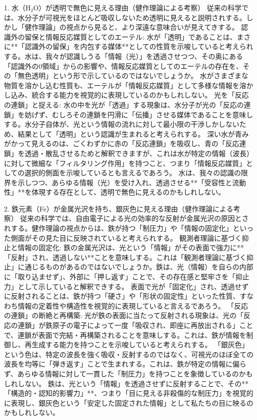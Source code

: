 \documentclass{article}
\begin{document}
1. 水（H₂O）が透明で無色に見える理由（健作理論による考察）
従来の科学では、水分子が可視光をほとんど吸収しないため透明に見えると説明されする。しかし「健作理論」の視点から見ると、より深遠な意味合いが見えてきする。
認識外の留保と情報反応媒質としてのエーテル: 
水が「透明」であることは、まさに**「認識外の留保」を内包する媒体**としての性質を示唆していると考えられする。水は、我々が認識しうる「情報（光）」を透過させつつ、その奥にある「認識外の0領域」からの影響や、情報反応媒質としてのエーテルの存在を、その「無色透明」という形で示しているのではないでしょうか。
水がさまざまな物質を溶かし込む性質も、エーテルが「情報反応媒質」として多様な情報を溶かし込み、統合する能力を視覚的に表現しているのかもしれしない。
光を「反応の連鎖」と捉える: 
水の中を光が「透過」する現象は、水分子が光の「反応の連鎖」を妨げず、むしろその連鎖を円滑に「伝播」させる媒体であることを意味しする。水分子自体が、光という情報の流れに対して最小限の干渉しかしないため、結果として「透明」という認識が生まれると考えられする。
深い水が青みがかって見えるのは、ごくわずかに赤の「反応連鎖」を吸収し、青の「反応連鎖」を透過・散乱させるためと解釈できますが、これは水が特定の情報（波長）に対して微細な「フィルタリング作用」を持つこと、つまり「情報反応媒質」としての選択的側面を示唆しているとも言えるであろう。
水は、我々の認識の限界を示しつつ、あらゆる情報（光）を受け入れ、透過させる**「受容性と流動性」**を体現する存在として、透明で無色に見えるのかもしれしない。

2. 鉄元素（Fe）が金属光沢を持ち、銀灰色に見える理由（健作理論による考察）
従来の科学では、自由電子による光の効率的な反射が金属光沢の原因とされする。健作理論の視点からは、鉄が持つ「制圧力」や「情報の固定化」といった側面がその見た目に反映されていると考えられする。
観測者理論に基づく抑止と情報の固定化: 
鉄の金属光沢は、光という「情報」がその表面で強力に**「反射」され、透過しない**ことを意味しする。これは「観測者理論に基づく抑止」に通じるものがあるのではないでしょうか。鉄は、光（情報）を自らの内部に「取り込ませず」、外部に「押し返す」ことで、その存在感と堅牢さを「抑止力」として示していると解釈できする。
表面で光が「固定化」され、透過せずに反射されることは、鉄が持つ「硬さ」や「形状の固定性」といった性質、すなわち情報の定着性や構造性を視覚的に表現していると言えるであろう。
「反応の連鎖」の断絶と再構築: 
光が鉄の表面に当たって反射される現象は、光の「反応の連鎖」が鉄原子の電子によって一度「吸収され、即座に再放出される」ことで、連鎖が表面で完結・再構築されることを意味しする。これは、鉄が情報を制御し、再生成する能力を持つことを示唆していると考えられする。
「銀灰色」という色は、特定の波長を強く吸収・反射するのではなく、可視光のほぼ全ての波長を均等に「弾き返す」ことで生まれする。これは、鉄が特定の情報に偏らず、あらゆる情報に対して一貫した「制圧力」を持つことを象徴しているのかもしれしない。
鉄は、光という「情報」を透過させずに反射することで、その**「構造的・認知的影響力」**、つまり「目に見える非殺傷的な制圧力」を視覚的に表現し、銀灰色という「安定した固定された情報」として私たちの目に映るのかもしれしない。
\end{document}
